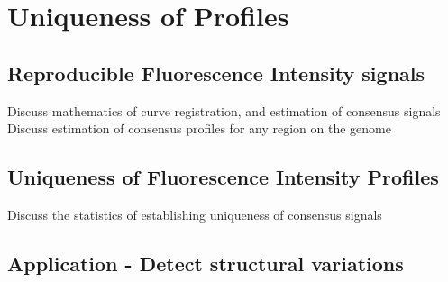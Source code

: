 \chapter{Uniqueness of Profiles}
\section{Reproducible Fluorescence Intensity signals}
Discuss mathematics of curve registration, and estimation of consensus signals
Discuss estimation of consensus profiles for any region on the genome

\section{Uniqueness of Fluorescence Intensity Profiles}
Discuss the statistics of establishing uniqueness of consensus signals

\section{Application - Detect structural variations}


